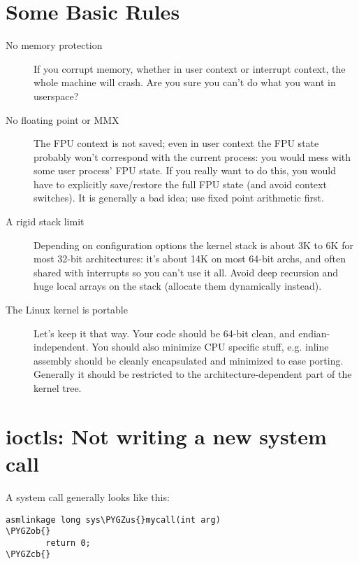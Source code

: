 \documentclass[a4paper,8pt,english]{sphinxmanual}
\def\PYGZus{\char`\_}
\def\PYGZob{\char`\{}
\def\PYGZcb{\char`\}}
\begin{document}
\section{Some Basic Rules}
\label{kernel-hacking/hacking:some-basic-rules}\begin{description}
\item[{No memory protection}] \leavevmode
If you corrupt memory, whether in user context or interrupt context,
the whole machine will crash. Are you sure you can't do what you
want in userspace?

\item[{No floating point or MMX}] \leavevmode
The FPU context is not saved; even in user context the FPU state
probably won't correspond with the current process: you would mess
with some user process' FPU state. If you really want to do this,
you would have to explicitly save/restore the full FPU state (and
avoid context switches). It is generally a bad idea; use fixed point
arithmetic first.

\item[{A rigid stack limit}] \leavevmode
Depending on configuration options the kernel stack is about 3K to
6K for most 32-bit architectures: it's about 14K on most 64-bit
archs, and often shared with interrupts so you can't use it all.
Avoid deep recursion and huge local arrays on the stack (allocate
them dynamically instead).

\item[{The Linux kernel is portable}] \leavevmode
Let's keep it that way. Your code should be 64-bit clean, and
endian-independent. You should also minimize CPU specific stuff,
e.g. inline assembly should be cleanly encapsulated and minimized to
ease porting. Generally it should be restricted to the
architecture-dependent part of the kernel tree.

\end{description}


\section{ioctls: Not writing a new system call}
\label{kernel-hacking/hacking:ioctls-not-writing-a-new-system-call}
A system call generally looks like this:

\begin{Verbatim}[commandchars=\\\{\}]
asmlinkage long sys\PYGZus{}mycall(int arg)
\PYGZob{}
        return 0;
\PYGZcb{}
\end{Verbatim}
\end{document}
